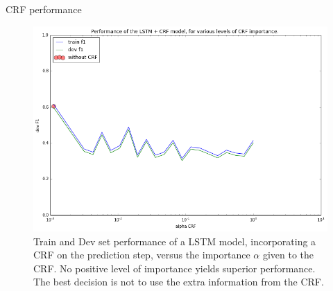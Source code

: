 \documentclass[final]{beamer}
\newlength{\onecolwid}
\begin{document}
\begin{frame}[t]
\begin{columns}[t]
\begin{column}{\onecolwid}

\begin{block}{CRF performance}

  \begin{figure}
  \begin{center}
  \includegraphics[width=600px]{figs/LSTM-CRF-vs-alpha.png}
  \caption{Train and Dev set performance of a LSTM model, incorporating a CRF on the prediction step, versus the importance $\alpha$ given to the CRF. No positive level of importance yields superior performance. The best decision is not to use the extra information from the CRF. }
  \label{lstm-crf-results}
  \end{center}
  \end{figure}

\end{block}





\end{column}
\end{columns}
\end{frame}
\end{document}
